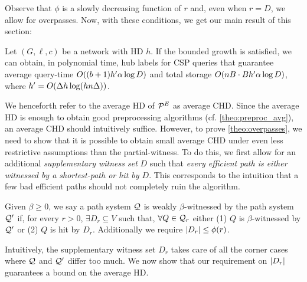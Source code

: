\documentclass[opre,nonblindrev]{informs3} %
\begin{document}
Observe that $\phi$ is a slowly decreasing function of $r$ and, even when $r=D$, we allow for overpasses.
Now, with these conditions, we get our main result of this section:


\begin{theorem}\label{theo:overpasses}
Let $(G,\ell,c)$ be a network with HD $h$.
If the bounded growth is satisfied, we can obtain, in polynomial time, hub labels for CSP queries that guarantee average query-time $O((b+1)h'\alpha \log D)$ and total storage $O(nB\cdot Bh'\alpha \log D)$, where $h'=O(\Delta h\log(hn\Delta))$.
\end{theorem}

We henceforth refer to the average HD of $\mathcal{P}^E$ as average CHD.
Since the average HD is enough to obtain good preprocessing algorithms (cf. \cref{theo:preproc_avg}), an average CHD should intuitively suffice.
However, to prove \cref{theo:overpasses}, we need to show that it is possible to obtain small average CHD under even less restrictive assumptions than the partial-witness.
To do this, we first allow for an additional \emph{supplementary witness set} $D$ such that \emph{every efficient path is either witnessed by a shortest-path or hit by $D$}.
This corresponds to the intuition that a few bad efficient paths should not completely ruin the algorithm. 

\begin{definition}
Given $\beta\geq 0$, we say a path system  $\mathcal{Q}$ is weakly $\beta$-witnessed by the path system $\mathcal{Q}'$ if, for every $r>0$, $\exists D_r\subseteq V$ such that, $\forall Q\in \mathcal{Q}_r$ either (1) $Q$ is $\beta$-witnessed by $\mathcal{Q}'$ or (2) $Q$ is hit by $D_r$.
Additionally we require $\lvert D_r\rvert\leq \phi(r)$.
\end{definition} 

Intuitively, the supplementary witness set $D_r$ takes care of all the corner cases where $\mathcal{Q}$ and $\mathcal{Q}'$ differ too much.
We now show that our requirement on $\lvert D_r\rvert$ guarantees a bound on the average HD.
\end{document}
